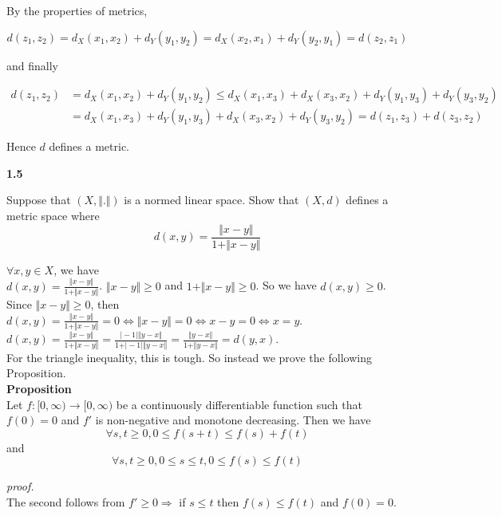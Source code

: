 \documentclass[12pt,a4paper]{article}
\begin{document}
	By the properties of metrics,
	
	\[
	d(z_1,z_2) = d_X(x_1,x_2) + d_Y(y_1,y_2) = d_X(x_2,x_1) + d_Y(y_2,y_1) = d(z_2,z_1)
	\]
	
	and finally
	
	\begin{align*}
	d(z_1,z_2) & = d_X(x_1,x_2) + d_Y(y_1,y_2) \le d_X(x_1,x_3) + d_X(x_3,x_2) + d_Y(y_1,y_3) + d_Y(y_3,y_2)\\
	& = d_X(x_1,x_3) + d_Y(y_1,y_3) + d_X(x_3,x_2) + d_Y(y_3,y_2) = d(z_1,z_3) + d(z_3,z_2)
	\end{align*}
	
	Hence $d$ defines a metric.
	
	
\pagebreak	
\textbf{1.5}
\begin{ques}
	Suppose that $(X, \Vert . \Vert)$ is a normed linear space. Show that $(X,d)$ defines a metric space where 
	$$d(x,y) = \frac{\Vert x-y \Vert}{1 + \Vert x-y \Vert}$$
\end{ques}
	
	$\forall x,y \in X$, we have\\
	
	$d(x,y) = \frac{\Vert x - y \Vert}{1 + \Vert x - y \Vert}$. $\Vert x - y \Vert \ge 0$ and $1 + \Vert x - y \Vert \ge 0$. So we have $d(x,y) \ge 0$.\\
	Since $\Vert x - y \Vert \ge 0$, then $d(x,y) = \frac{\Vert x - y \Vert}{1 + \Vert x - y \Vert} = 0 \Longleftrightarrow \Vert x - y \Vert = 0 \Longleftrightarrow x - y  = 0 \Longleftrightarrow x = y$.\\
	
	$d(x,y) = \frac{\Vert x - y \Vert}{1 + \Vert x - y \Vert} = \frac{\vert -1 \vert \Vert y - x \Vert}{1 + \vert -1 \vert \Vert y - x \Vert} = \frac{\Vert y - x \Vert}{1 + \Vert y - x \Vert} = d(y,x)$.\\
	
	For the triangle inequality, this is tough. So instead we prove the following Proposition.\\
	\textbf{Proposition}\\
	Let $f:[0,\infty) \rightarrow [0,\infty)$ be a continuously differentiable function such that $f(0) = 0$ and $f'$ is non-negative and monotone decreasing. Then we have
	$$\forall s,t \ge 0, 0 \le f(s+t) \le f(s) + f(t)$$
	and
	$$\forall s,t \ge 0, 0 \le s \le t, 0 \le f(s) \le f(t)$$
	
	\emph{proof.}\\
	The second follows from $f'\ge 0 \Rightarrow$ if $s\le t$ then $f(s) \le f(t)$ and $f(0) = 0$.\\
	
\end{document}
